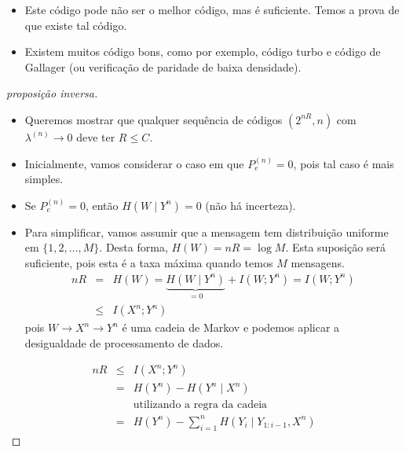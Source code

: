 \begin{frame}[allowframebreaks]
\begin{itemize}
  \item Este código pode não ser o melhor código, mas é suficiente. Temos a prova de que existe tal código.
 
  \item Existem muitos código bons, como por exemplo, código turbo e código de Gallager 
	(ou verificação de paridade de baixa densidade).
  \end{itemize}


  \framebreak

  \begin{proof}[proposição inversa]
  \begin{itemize}
  \item Queremos mostrar que qualquer sequência de códigos $(2^{nR},n)$ com $\lambda^{(n)} \rightarrow 0$ deve ter $R \leq C$.
  \item Inicialmente, vamos considerar o caso em que $P_e^{(n)} = 0$, pois tal caso é mais simples.
  \end{itemize}

  \proofbreak

  \begin{itemize}
  \item Se $P_e^{(n)} = 0$, então $H(W \mid Y^n) = 0$ (não há incerteza).
  \item Para simplificar, vamos assumir que a mensagem tem distribuição uniforme em $\{1, 2, \ldots, M\}$.
	Desta forma, $H(W) = nR = \log M$. Esta suposição será suficiente, pois esta é a taxa máxima quando temos $M$ mensagens.
	\begin{eqnarray}
	nR &=& H(W) = \underbrace{H(W \mid Y^n)}_{=0} + I(W;Y^n) = I(W;Y^n) \nonumber \\
		&\leq& I(X^n;Y^n)
	\end{eqnarray}
	pois $W \rightarrow X^n \rightarrow Y^n$ é uma cadeia de Markov e podemos aplicar a desigualdade de processamento de dados.
  \end{itemize}
  
  \proofbreak

	\vspace{-0.75cm}
       \begin{eqnarray} 
	nR &\leq& I(X^n;Y^n) \nonumber \\
		&=& H(Y^n) - H(Y^n \mid X^n) \nonumber \\
		&& \text{utilizando a regra da cadeia} \nonumber \\
		&=& H(Y^n) - \sum_{i=1}^{n} H(Y_i \mid Y_{1:i-1}, X^n) 
	\end{eqnarray}


\end{proof}
\end{frame}
